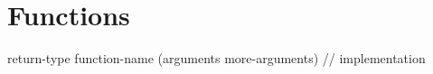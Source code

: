 \chapter{Functions}


return-type
function-name (arguments
               more-arguments)
{
    // implementation
}
